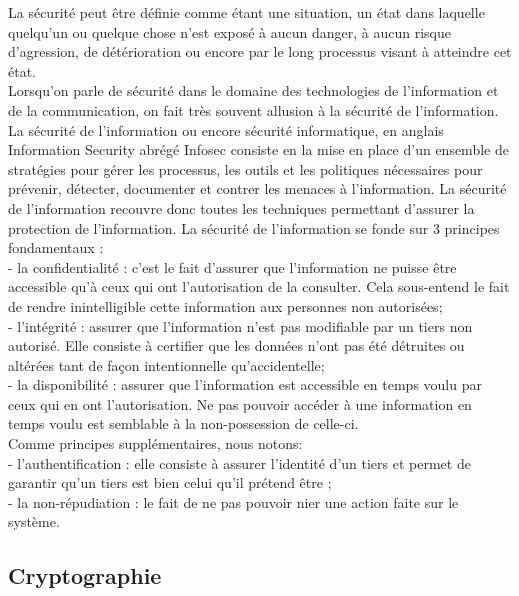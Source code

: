 La sécurité peut être définie comme étant une situation, un état dans laquelle quelqu’un ou quelque chose n’est exposé à aucun danger, à aucun risque d’agression, de détérioration ou encore par le long processus visant à atteindre cet état. \\
Lorsqu’on parle de sécurité dans le domaine des technologies de l’information et de la communication, on fait très souvent allusion à la sécurité de l’information. La sécurité de l'information ou encore sécurité informatique, en anglais Information Security abrégé Infosec consiste en la mise en place d’un ensemble de stratégies pour gérer les processus, les outils et les politiques nécessaires pour prévenir, détecter, documenter et contrer les menaces à l'information. La sécurité de l’information recouvre donc toutes les techniques permettant d’assurer la protection de l’information.  La sécurité de l’information se fonde sur 3 principes fondamentaux : \\
-	la confidentialité : c’est le fait d’assurer que l’information ne puisse être accessible qu’à ceux qui ont l’autorisation de la consulter. Cela sous-entend le fait de rendre inintelligible cette information aux personnes non autorisées; \\
-	l’intégrité : assurer que l’information n’est pas modifiable par un tiers non autorisé. Elle consiste à certifier que les données n’ont pas été détruites ou altérées tant de façon intentionnelle qu’accidentelle; \\
-	la disponibilité : assurer que l’information est accessible en temps voulu par ceux qui en ont l’autorisation. Ne pas pouvoir accéder à une information en temps voulu est semblable à la non-possession de celle-ci.\\
Comme principes supplémentaires, nous notons:\\
-	l’authentification : elle consiste à assurer l’identité d’un tiers et permet de garantir qu’un tiers est bien celui qu’il prétend être ;\\
-	la non-répudiation : le fait de ne pas pouvoir nier une action faite sur le système.\\

\subsection{Cryptographie}

